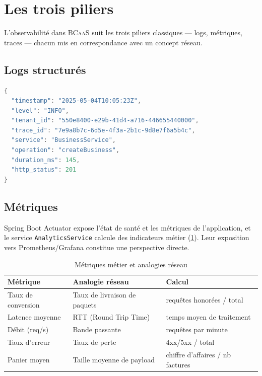 \documentclass[12pt,a4paper]{report}
\theoremstyle{definition}
\theoremstyle{remark}
\newcommand{\bcaas}{\textsc{BCaaS}}
\begin{document}
\section{Les trois piliers}

L'observabilité dans \bcaas{} suit les trois piliers classiques — logs, métriques, traces — chacun mis en correspondance avec un concept réseau.

\subsection{Logs structurés}
\begin{lstlisting}[language=java, caption=Exemple de log structuré (JSON)]
{
  "timestamp": "2025-05-04T10:05:23Z",
  "level": "INFO",
  "tenant_id": "550e8400-e29b-41d4-a716-446655440000",
  "trace_id": "7e9a8b7c-6d5e-4f3a-2b1c-9d8e7f6a5b4c",
  "service": "BusinessService",
  "operation": "createBusiness",
  "duration_ms": 145,
  "http_status": 201
}
\end{lstlisting}

\subsection{Métriques}
Spring Boot Actuator expose l'état de santé et les métriques de l'application, et le service \texttt{AnalyticsService} calcule des indicateurs métier (\cref{tab:metriques}). Leur exposition vers Prometheus/Grafana constitue une perspective directe.

\begin{table}[h]
	\centering
	\caption{Métriques métier et analogies réseau}
	\label{tab:metriques}
	\begin{tabularx}{\textwidth}{lXX}
		\toprule
		\textbf{Métrique} & \textbf{Analogie réseau} & \textbf{Calcul} \\
		\midrule
		Taux de conversion & Taux de livraison de paquets & requêtes honorées / total \\
		Latence moyenne & RTT (Round Trip Time) & temps moyen de traitement \\
		Débit (req/s) & Bande passante & requêtes par minute \\
		Taux d'erreur & Taux de perte & 4xx/5xx / total \\
		Panier moyen & Taille moyenne de payload & chiffre d'affaires / nb factures \\
		\bottomrule
	\end{tabularx}
\end{table}
\end{document}
